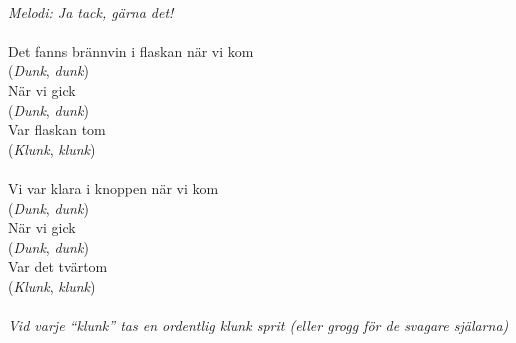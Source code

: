 \\
{\footnotesize\textit{Melodi: Ja tack, gärna det!}}\\
\\
Det fanns brännvin i flaskan när vi kom\\
(\textit{Dunk}, \textit{dunk})\\
När vi gick\\
(\textit{Dunk}, \textit{dunk})\\
Var flaskan tom\\
(\textit{Klunk}, \textit{klunk})\\
\\
Vi var klara i knoppen när vi kom\\
(\textit{Dunk}, \textit{dunk})\\
När vi gick\\
(\textit{Dunk}, \textit{dunk})\\
Var det tvärtom\\
(\textit{Klunk}, \textit{klunk})\\
\\
{\footnotesize\textit{Vid varje ``klunk'' tas en ordentlig klunk sprit (eller grogg för de svagare själarna)}}
